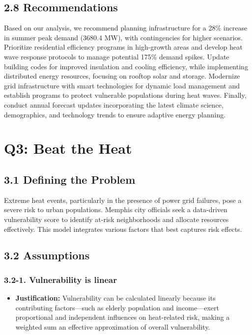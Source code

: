 \documentclass{article}
\begin{document}
 \subsection*{2.8 Recommendations}
 Based on our analysis, we recommend planning infrastructure for a 28\% increase in summer peak demand (3680.4 MW), with contingencies for higher scenarios. Prioritize residential efficiency programs in high-growth areas and develop heat wave response protocols to manage potential 175\% demand spikes. Update building codes for improved insulation and cooling efficiency, while implementing distributed energy resources, focusing on rooftop solar and storage. Modernize grid infrastructure with smart technologies for dynamic load management and establish programs to protect vulnerable populations during heat waves. Finally, conduct annual forecast updates incorporating the latest climate science, demographics, and technology trends to ensure adaptive energy planning.







\section*{$\mathbf{Q3}$: Beat the Heat}
\subsection*{3.1 Defining the Problem}
Extreme heat events, particularly in the presence of power grid failures, pose a severe risk to urban populations. Memphis city officials seek a data-driven vulnerability score to identify at-risk neighborhoods and allocate resources effectively. This model integrates various factors that best captures risk effects.
\subsection*{3.2 Assumptions}
\subsubsection*{3.2-1. Vulnerability is linear}
\begin{itemize}
    \item \textbf{Justification:} 
    Vulnerability can be calculated linearly because its contributing factors—such as elderly population and income—exert proportional and independent influences on heat-related risk, making a weighted sum an effective approximation of overall vulnerability.
\end{itemize}
\end{document}
